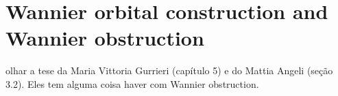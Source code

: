 %
%


\chapter{Wannier orbital construction and Wannier obstruction}

olhar a tese da Maria Vittoria Gurrieri (capítulo 5) e do Mattia Angeli (seção 3.2). Eles tem alguma coisa haver com Wannier obstruction.




%
%
%
